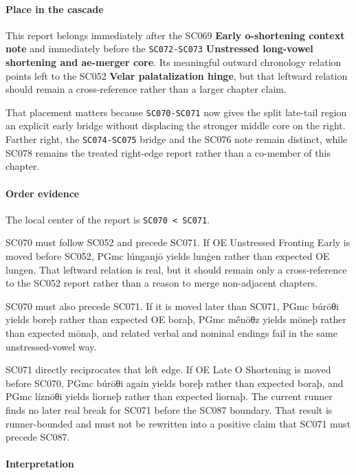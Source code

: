 \documentclass[
  british,
  a4paper,
]{article}
\begin{document}
\paragraph{Place in the cascade}\label{place-in-the-cascade-44}

This report belongs immediately after the SC069 \textbf{Early
o-shortening context note} and immediately before the
\texttt{SC072-SC073} \textbf{Unstressed long-vowel shortening and
ae-merger core}. Its meaningful outward chronology relation points left
to the SC052 \textbf{Velar palatalization hinge}, but that leftward
relation should remain a cross-reference rather than a larger chapter
claim.

That placement matters because \texttt{SC070-SC071} now gives the split
late-tail region an explicit early bridge without displacing the
stronger middle core on the right. Farther right, the
\texttt{SC074-SC075} bridge and the SC076 note remain distinct, while
SC078 remains the treated right-edge report rather than a co-member of
this chapter.

\paragraph{Order evidence}\label{order-evidence-44}

The local center of the report is \texttt{SC070\ \textless{}\ SC071}.

SC070 must follow SC052 and precede SC071. If OE Unstressed Fronting
Early is moved before SC052, PGmc lúnganjō yields lunġen rather than
expected OE lungen. That leftward relation is real, but it should remain
only a cross-reference to the SC052 report rather than a reason to merge
non-adjacent chapters.

SC070 must also precede SC071. If it is moved later than SC071, PGmc
búrōθi yields boreþ rather than expected OE boraþ, PGmc mḗnōθz yields
mōneþ rather than expected mōnaþ, and related verbal and nominal endings
fail in the same unstressed-vowel way.

SC071 directly reciprocates that left edge. If OE Late O Shortening is
moved before SC070, PGmc búrōθi again yields boreþ rather than expected
boraþ, and PGmc líznōθi yields liorneþ rather than expected liornaþ. The
current runner finds no later real break for SC071 before the SC087
boundary. That result is runner-bounded and must not be rewritten into a
positive claim that SC071 must precede SC087.

\paragraph{Interpretation}\label{interpretation-44}
\end{document}
